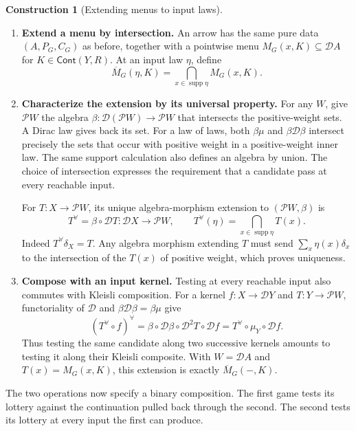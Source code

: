 \documentclass[11pt,a4paper]{article}
\theoremstyle{definition}
\newtheorem*{construction}{Construction}
\newcommand{\D}{\mathcal D}
\newcommand{\Pow}{\mathcal P}
\newcommand{\supp}{\operatorname{supp}}
\begin{document}
\begin{construction}[Extending menus to input laws]\leavevmode
    \begin{enumerate}[titledsteps]
        \item \textbf{Extend a menu by intersection.} An arrow has the same pure data $(A,P_G,C_G)$ as before, together with a pointwise menu $M_G(x,K)\subseteq\D A$ for $K\in\mathsf{Cont}(Y,R)$. At an input law $\eta$, define
        \[
            \overline M_G(\eta,K)=\bigcap_{x\in\supp\eta}M_G(x,K).
        \]

        \item \textbf{Characterize the extension by its universal property.} For any $W$, give $\Pow W$ the algebra $\beta:\D(\Pow W)\to\Pow W$ that intersects the positive-weight sets. A Dirac law gives back its set. For a law of laws, both $\beta\mu$ and $\beta\D\beta$ intersect precisely the sets that occur with positive weight in a positive-weight inner law. The same support calculation also defines an algebra by union. The choice of intersection expresses the requirement that a candidate pass at every reachable input.

        For $T:X\to\Pow W$, its unique algebra-morphism extension to $(\Pow W,\beta)$ is
        \[
            T^\forall=\beta\circ\D T:\D X\longrightarrow\Pow W,\qquad
            T^\forall(\eta)=\bigcap_{x\in\supp\eta}T(x).
        \]
        Indeed $T^\forall\delta_X=T$. Any algebra morphism extending $T$ must send $\sum_x\eta(x)\delta_x$ to the intersection of the $T(x)$ of positive weight, which proves uniqueness.

        \item \textbf{Compose with an input kernel.} Testing at every reachable input also commutes with Kleisli composition. For a kernel $f:X\to\D Y$ and $T:Y\to\Pow W$, functoriality of $\D$ and $\beta\D\beta=\beta\mu$ give
        \[
            (T^\forall\circ f)^\forall
            =\beta\circ\D\beta\circ\D^2T\circ\D f
            =T^\forall\circ\mu_Y\circ\D f.
        \]
        Thus testing the same candidate along two successive kernels amounts to testing it along their Kleisli composite. With $W=\D A$ and $T(x)=M_G(x,K)$, this extension is exactly $\overline M_G(-,K)$.
    \end{enumerate}
\end{construction}

The two operations now specify a binary composition. The first game tests its lottery against the continuation pulled back through the second. The second tests its lottery at every input the first can produce.
\end{document}
